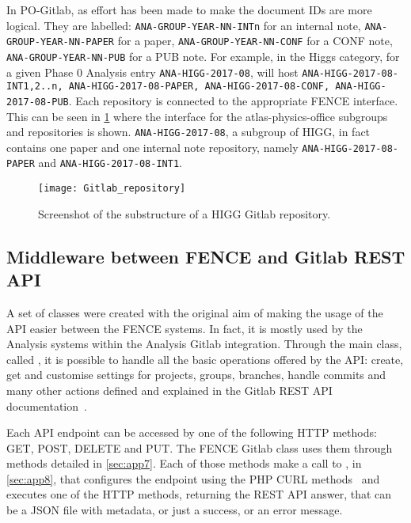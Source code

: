 In PO-Gitlab, as effort has been made to make the document IDs are more logical.
They are labelled: \texttt{ANA-GROUP-YEAR-NN-INTn} for an internal note,
\texttt{ANA-GROUP-YEAR-NN-PAPER} for a paper,
\texttt{ANA-GROUP-YEAR-NN-CONF} for a CONF note,
\texttt{ANA-GROUP-YEAR-NN-PUB} for a PUB note.
For example, in the Higgs category, for a given Phase 0 Analysis entry \texttt{ANA-HIGG-2017-08},
\pogitlab will host \texttt{ANA-HIGG-2017-08-INT1,2..n, ANA-HIGG-2017-08-PAPER, ANA-HIGG-2017-08-CONF, ANA-HIGG-2017-08-PUB}.
Each repository is connected to the appropriate FENCE interface.
This can be seen in \cref{fig:Gitlab_repository} where the \gitlab interface for the atlas-physics-office subgroups and repositories is shown.
\texttt{ANA-HIGG-2017-08}, a subgroup of HIGG, in fact contains one paper and one internal note repository, namely \texttt{ANA-HIGG-2017-08-PAPER} and \texttt{ANA-HIGG-2017-08-INT1}.

\begin{figure}[htb]
  \centering
  \texttt{[image: Gitlab\_repository]}
  \caption{Screenshot of the substructure of a HIGG Gitlab repository. }%
  \label{fig:Gitlab_repository}
\end{figure}

\subsection{Middleware between FENCE and Gitlab REST API}%
\label{sec:Middleware_between_FENCE_and_Gitlab_REST_API}

A set of classes were created with the original aim of making the usage of the \gitlab API easier between the FENCE systems.
In fact, it is mostly used by the Analysis systems within the Analysis Gitlab integration.
Through the main class, called , it is possible to handle all the basic operations offered by the API\@: create, get and customise settings for projects, groups, branches, handle commits and many other actions defined and explained in the Gitlab REST API documentation~\cite{rest_api}.

Each API endpoint can be accessed by one of the following HTTP methods: GET, POST, DELETE and PUT\@.
The FENCE Gitlab class uses them through methods detailed in \cref{sec:app7}.
Each of those methods make a call to , in \cref{sec:app8}, that configures the endpoint using the PHP CURL methods~\cite{php_curl} and executes one of the HTTP methods, returning the REST API answer, that can be a JSON file with metadata, or just a success, or an error message.

